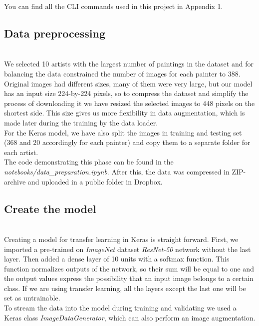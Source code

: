 \documentclass[
	12pt, %
]{fphw}
\begin{document}
You can find all the CLI commands used in this project in Appendix 1. 

\subsection*{Data preprocessing}
\ \\  

We selected 10 artists with the largest number of paintings in the dataset and for balancing the data constrained the number of images for each painter to 388. Original images had different sizes, many of them were very large, but our model has an input size 224-by-224 pixels, so to compress the dataset and simplify the process of downloading it we have resized the selected images to 448 pixels on the shortest side. This size gives us more flexibility in data augmentation, which is made later during the training by the data loader.\\

For the Keras model, we have also split the images in training and testing set (368 and 20 accordingly for each painter) and copy them to a separate folder for each artist.\\

The code demonstrating this phase can be found in the \textit{notebooks/data\_preparation.ipynb}. After this, the data was compressed in ZIP-archive and uploaded in a public folder in Dropbox.

\pagebreak
\subsection*{Create the model}
\ \\  

Creating a model for transfer learning in Keras is straight forward. First, we imported a pre-trained on \textit{ImageNet} dataset \textit{ResNet-50} network without the last layer. Then added a dense layer of 10 units with a softmax function. This function normalizes outputs of the network, so their sum will be equal to one and the output values express the possibility that an input image belongs to a certain class. If we are using transfer learning, all the layers except the last one will be set as untrainable. \\

To stream the data into the model during training and validating we used a Keras class \textit{ImageDataGenerator}, which can also perform an image augmentation.\\
\end{document}
